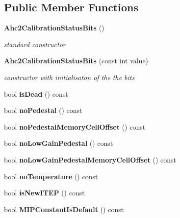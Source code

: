 \subsection*{Public Member Functions}
\begin{DoxyCompactItemize}
\item 
{\bf Ahc2\-Calibration\-Status\-Bits} ()
\begin{DoxyCompactList}\small\item\em standard constructor \end{DoxyCompactList}\item 
{\bf Ahc2\-Calibration\-Status\-Bits} (const int value)
\begin{DoxyCompactList}\small\item\em constructor with initialisaton of the the bits \end{DoxyCompactList}\item 
bool {\bfseries is\-Dead} () const \label{classCALICE_1_1Ahc2CalibrationStatusBits_ac0d15dd4f791b91c9c6ad5fe41fd6cc3}

\item 
bool {\bfseries no\-Pedestal} () const \label{classCALICE_1_1Ahc2CalibrationStatusBits_a6edc0dfbb241566136c21ab01669fc51}

\item 
bool {\bfseries no\-Pedestal\-Memory\-Cell\-Offset} () const \label{classCALICE_1_1Ahc2CalibrationStatusBits_af7272c75ed01acdb4c14157610a88f2f}

\item 
bool {\bfseries no\-Low\-Gain\-Pedestal} () const \label{classCALICE_1_1Ahc2CalibrationStatusBits_a2a2377dba3c46ceb660bbc670f87af04}

\item 
bool {\bfseries no\-Low\-Gain\-Pedestal\-Memory\-Cell\-Offset} () const \label{classCALICE_1_1Ahc2CalibrationStatusBits_acfbded3e6c17cd44b083cfb38b41e553}

\item 
bool {\bfseries no\-Temperature} () const \label{classCALICE_1_1Ahc2CalibrationStatusBits_a9fb04b1b5428592afefa219ecf9aec49}

\item 
bool {\bfseries is\-New\-I\-T\-E\-P} () const \label{classCALICE_1_1Ahc2CalibrationStatusBits_a6fb3027bf68829d150668f0184423ecd}

\item 
bool {\bfseries M\-I\-P\-Constant\-Is\-Default} () const \label{classCALICE_1_1Ahc2CalibrationStatusBits_af11386a9a08c65042522c4b2af4f9f6f}


\end{DoxyCompactItemize}
